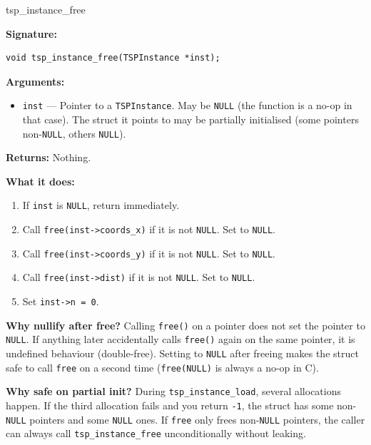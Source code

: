 \begin{apispec}{tsp\_instance\_free}

\textbf{Signature:}
\begin{lstlisting}[style=cstyle, numbers=none]
void tsp_instance_free(TSPInstance *inst);
\end{lstlisting}

\textbf{Arguments:}
\begin{itemize}
  \item \texttt{inst} --- Pointer to a \texttt{TSPInstance}. May be \texttt{NULL} (the function is a no-op in that case). The struct it points to may be partially initialised (some pointers non-\texttt{NULL}, others \texttt{NULL}).
\end{itemize}

\textbf{Returns:} Nothing.

\textbf{What it does:}
\begin{enumerate}[label=\arabic*.]
  \item If \texttt{inst} is \texttt{NULL}, return immediately.
  \item Call \texttt{free(inst->coords\_x)} if it is not \texttt{NULL}. Set to \texttt{NULL}.
  \item Call \texttt{free(inst->coords\_y)} if it is not \texttt{NULL}. Set to \texttt{NULL}.
  \item Call \texttt{free(inst->dist)} if it is not \texttt{NULL}. Set to \texttt{NULL}.
  \item Set \texttt{inst->n = 0}.
\end{enumerate}

\textbf{Why nullify after free?} Calling \texttt{free()} on a pointer does not set the pointer to \texttt{NULL}. If anything later accidentally calls \texttt{free()} again on the same pointer, it is undefined behaviour (double-free). Setting to \texttt{NULL} after freeing makes the struct safe to call \texttt{free} on a second time (\texttt{free(NULL)} is always a no-op in C).

\textbf{Why safe on partial init?} During \texttt{tsp\_instance\_load}, several allocations happen. If the third allocation fails and you return \texttt{-1}, the struct has some non-\texttt{NULL} pointers and some \texttt{NULL} ones. If \texttt{free} only frees non-\texttt{NULL} pointers, the caller can always call \texttt{tsp\_instance\_free} unconditionally without leaking.

\end{apispec}

\vspace{8pt}

